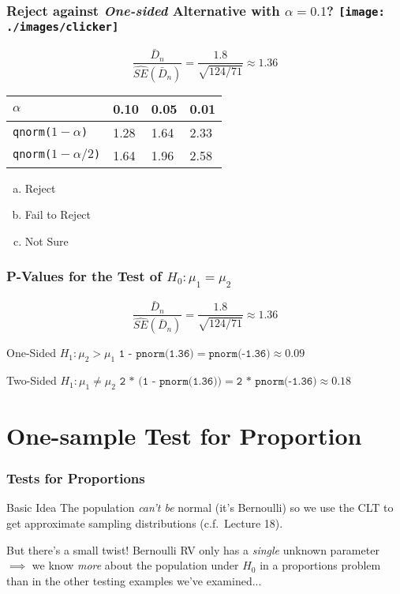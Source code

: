 \begin{frame}
\frametitle{Reject against \emph{One-sided} Alternative with $\alpha = 0.1$?  \texttt{[image: ./images/clicker]}}

	$$\boxed{\displaystyle \frac{\bar{D}_n}{\widehat{SE}(\bar{D}_n)}= \frac{1.8}{\sqrt{124/71}} \approx 1.36} $$

\begin{center}
\begin{tabular}{l|lll}
$\alpha$ &   0.10& 0.05 &0.01\\
\hline
\texttt{qnorm($1-\alpha$)} & 1.28 &1.64 &2.33\\
\texttt{qnorm($1-\alpha/2$)} &1.64 &1.96& 2.58
\end{tabular}
\end{center}

\begin{enumerate}[(a)]
\item Reject
\item Fail to Reject
\item Not Sure
\end{enumerate}



\end{frame}

\begin{frame}
\frametitle{P-Values for the Test of $H_0\colon \mu_1 = \mu_2$}

	$$\boxed{\displaystyle \frac{\bar{D}_n}{\widehat{SE}(\bar{D}_n)}= \frac{1.8}{\sqrt{124/71}} \approx 1.36} $$

\begin{block}{One-Sided $H_1\colon \mu_2 > \mu_1 $} 
$\texttt{1 - pnorm(1.36)} =  \texttt{pnorm(-1.36)}  \approx 0.09$ 
\end{block}

\begin{block}{Two-Sided $H_1 \colon \mu_1 \neq \mu_2$} 
$\texttt{2 * (1 - pnorm(1.36))} =  \texttt{2 * pnorm(-1.36)} \approx 0.18$
\end{block}
\end{frame}
\section{One-sample Test for Proportion}
\begin{frame}
	\frametitle{Tests for Proportions}
	\begin{block}
		{Basic Idea}
		The population \emph{can't be} normal (it's Bernoulli) so we use the CLT to get approximate sampling distributions (c.f.\ Lecture 18).
	\end{block}
	\begin{block}
		{But there's a small twist!}
		Bernoulli RV only has a \emph{single} unknown parameter $\implies$  we know \emph{more} about the population under $H_0$ in a proportions problem than in the other testing examples we've examined...	
	\end{block}


\end{frame}

